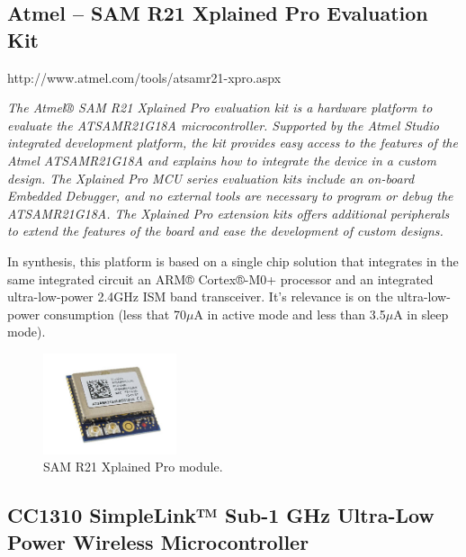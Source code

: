 \subsection{Atmel -- SAM R21 Xplained Pro Evaluation Kit}



\begin{framed}

	http://www.atmel.com/tools/atsamr21-xpro.aspx
\vspace{1em}
	\hline
\vspace{1em}

\textit{The Atmel® SAM R21 Xplained Pro evaluation kit is a hardware platform to evaluate the ATSAMR21G18A microcontroller. Supported by the Atmel Studio integrated development platform, the kit provides easy access to the features of the Atmel ATSAMR21G18A and explains how to integrate the device in a custom design. The Xplained Pro MCU series evaluation kits include an on-board Embedded Debugger, and no external tools are necessary to program or debug the ATSAMR21G18A. The Xplained Pro extension kits offers additional peripherals to extend the features of the board and ease the development of custom designs.}
\end{framed}

In synthesis, this platform is based on a single chip solution that integrates in the same integrated circuit an ARM® Cortex®-M0+ processor and an integrated ultra-low-power 2.4GHz ISM
band transceiver. It's relevance is on the ultra-low-power consumption (less that 70$\mu$A in active mode and less than 3.5$\mu$A in sleep mode).

\begin{figure}[h!]
	\centering
	\includegraphics[width=0.35\textwidth,keepaspectratio]{figures/samr21}
	\caption{SAM R21 Xplained Pro module.}

\end{figure}


\subsection{CC1310 SimpleLink™ Sub-1 GHz Ultra-Low Power Wireless Microcontroller}

